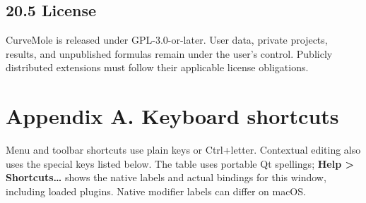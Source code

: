 \documentclass[
  10pt,
  a4paper,
  oneside]{scrreprt}
\begin{document}
\hypertarget{license}{%
\section{20.5 License}\label{license}}

CurveMole is released under GPL-3.0-or-later. User data, private
projects, results, and unpublished formulas remain under the user's
control. Publicly distributed extensions must follow their applicable
license obligations.

\hypertarget{appendix-a.-keyboard-shortcuts}{%
\chapter{Appendix A. Keyboard
shortcuts}\label{appendix-a.-keyboard-shortcuts}}

Menu and toolbar shortcuts use plain keys or Ctrl+letter. Contextual
editing also uses the special keys listed below. The table uses portable
Qt spellings; \textbf{Help \textgreater{} Shortcuts\ldots{}} shows the
native labels and actual bindings for this window, including loaded
plugins. Native modifier labels can differ on macOS.
\end{document}
